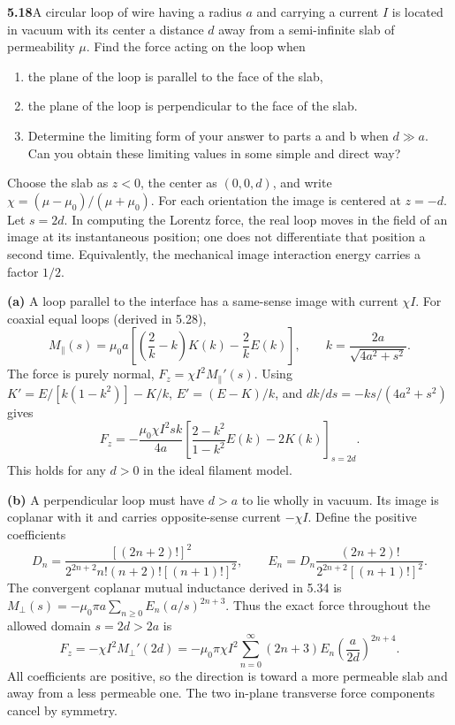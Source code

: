 \par\bigskip
\noindent\textbf{5.18}\quad A circular loop of wire having a radius $a$ and carrying a current $I$ is located in vacuum with its center a distance $d$ away from a semi-infinite slab of permeability $\mu$. Find the force acting on the loop when
\begin{enumerate}
\item[(a)] the plane of the loop is parallel to the face of the slab,
\item[(b)] the plane of the loop is perpendicular to the face of the slab.
\item[(c)] Determine the limiting form of your answer to parts a and b when $d\gg a$. Can you obtain these limiting values in some simple and direct way?
\end{enumerate}
\solution
Choose the slab as $z<0$, the center as $(0,0,d)$, and write
$\chi=(\mu-\mu_0)/(\mu+\mu_0)$.
For each orientation the image is centered at $z=-d$. Let $s=2d$.
In computing the Lorentz force, the real loop moves in the field of
an image at its instantaneous position; one does not differentiate
that position a second time. Equivalently, the mechanical image
interaction energy carries a factor $1/2$.

\textbf{(a)} A loop parallel to the interface has a same-sense image
with current $\chi I$. For coaxial equal loops (derived in 5.28),
\[
M_\parallel(s)=\mu_0a\left[\left(\frac2k-k\right)K(k)-\frac2kE(k)\right],
\qquad k=\frac{2a}{\sqrt{4a^2+s^2}}.
\]
The force is purely normal, $F_z=\chi I^2M_\parallel'(s)$.
Using
$K'=E/[k(1-k^2)]-K/k$, $E'=(E-K)/k$, and
$dk/ds=-ks/(4a^2+s^2)$ gives
\[
\boxed{F_z=-\frac{\mu_0\chi I^2s k}{4a}
\left[\frac{2-k^2}{1-k^2}E(k)-2K(k)\right]_{s=2d}.}
\]
This holds for any $d>0$ in the ideal filament model.

\textbf{(b)} A perpendicular loop must have $d>a$ to lie wholly
in vacuum. Its image is coplanar with it and carries opposite-sense
current $-\chi I$. Define the positive coefficients
\[
D_n=\frac{[(2n+2)!]^2}
{2^{2n+2}n!(n+2)![(n+1)!]^2},\qquad
E_n=D_n\frac{(2n+2)!}{2^{2n+2}[(n+1)!]^2}.
\]
The convergent coplanar mutual inductance derived in 5.34 is
$M_\perp(s)=-\mu_0\pi a\sum_{n\ge0}E_n(a/s)^{2n+3}$.
Thus the exact force throughout the allowed domain $s=2d>2a$ is
\[
\boxed{F_z=-\chi I^2M_\perp'(2d)
=-\mu_0\pi\chi I^2\sum_{n=0}^\infty
(2n+3)E_n\left(\frac{a}{2d}\right)^{2n+4}.}
\]
All coefficients are positive, so the direction is toward a more
permeable slab and away from a less permeable one.
The two in-plane transverse force components cancel by symmetry.

